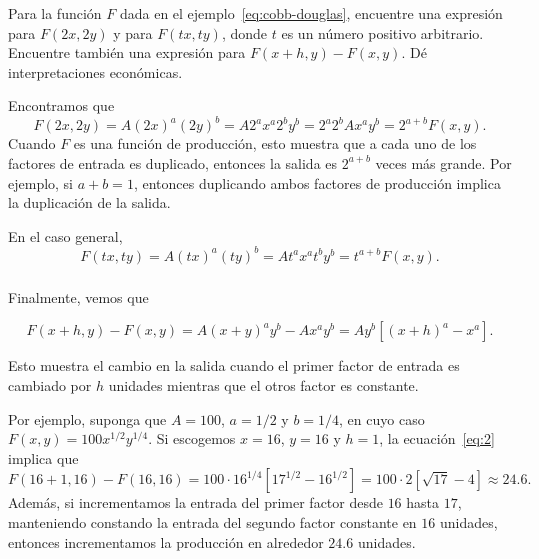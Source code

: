 \begin{frame}[t]
\frametitle{\secname}

\begin{example}
Para la función $F$ dada en el ejemplo~\eqref{eq:cobb-douglas}, encuentre una expresión para $F\left(2x,2y\right)$ y para $F\left(tx,ty\right)$, donde $t$ es un número positivo arbitrario. Encuentre también una expresión para $F\left(x+h,y\right)-F\left(x,y\right)$. Dé interpretaciones económicas.
\end{example}

\begin{proofs}
Encontramos que \[ F\left(2x,2y\right)=A{\left(2x\right)}^{a}{\left(2y\right)}^{b}=A2^{a}x^{a}2^{b}y^{b}=2^{a}2^{b}Ax^{a}y^{b}=2^{a+b}F\left(x,y\right). \] Cuando $F$ es una función de producción, esto muestra que a cada uno de los factores de entrada es duplicado, entonces la salida es $2^{a+b}$ veces más grande. Por ejemplo, si $a+b=1$, entonces duplicando ambos factores de producción implica la duplicación de la salida.

En el caso general,
\begin{equation}\label{eq:1}
F\left(tx,ty\right)=A{\left(tx\right)}^{a}{\left(ty\right)}^{b}=At^{a}x^{a}t^{b}y^{b}=t^{a+b}F\left(x,y\right).\tag{*}
\end{equation}
\end{proofs}
\end{frame}

\begin{frame}
\frametitle{\secname}
\begin{proofs}
Finalmente, vemos que

\begin{equation}\label{eq:2}
F\left(x+h,y\right)-F\left(x,y\right)=A{\left(x+y\right)}^{a}y^{b}-Ax^{a}y^{b}=Ay^{b}\left[{\left(x+h\right)}^{a}-x^{a}\right].\tag{**}
\end{equation}

Esto muestra el cambio en la salida cuando el primer factor de entrada es cambiado por $h$ unidades mientras que el otros factor es constante.

Por ejemplo, suponga que $A=100$, $a=1/2$ y $b=1/4$, en cuyo caso $F\left(x,y\right)=100x^{1/2}y^{1/4}$. Si escogemos $x=16$, $y=16$ y $h=1$, la ecuación~\eqref{eq:2} implica que \[ F\left(16+1,16\right)-F\left(16,16\right)=100\cdot16^{1/4}\left[17^{1/2}-16^{1/2}\right]=100\cdot2\left[\sqrt{17}-4\right]\approx24.6. \]
Además, si incrementamos la entrada del primer factor desde $16$ hasta $17$, manteniendo constando la entrada del segundo factor constante en $16$ unidades, entonces incrementamos la producción en alrededor $24.6$ unidades.
\end{proofs}
\end{frame}

